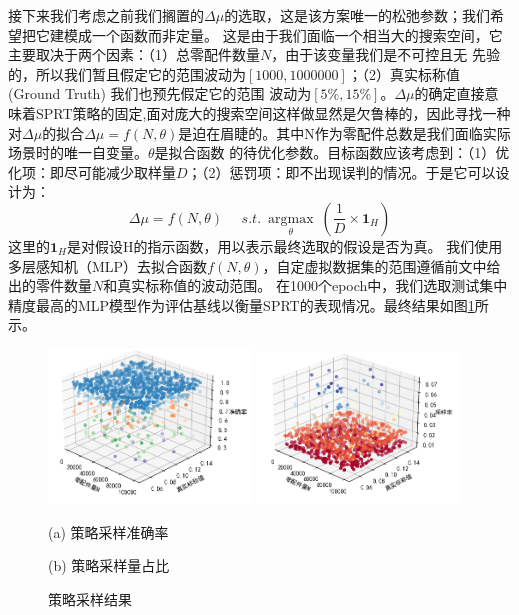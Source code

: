 \documentclass[withoutpreface,bwprint]{cumcmthesis} %
\begin{document}
接下来我们考虑之前我们搁置的$\Delta \mu$的选取，这是该方案唯一的松弛参数；我们希望把它建模成一个函数而非定量。
这是由于我们面临一个相当大的搜索空间，它主要取决于两个因素：（1）总零配件数量$N$，由于该变量我们是不可控且无
先验的，所以我们暂且假定它的范围波动为$[1000,1000000]$；（2）真实标称值(Ground Truth) 我们也预先假定它的范围
波动为$[5\%,15\%]$。$\Delta \mu$的确定直接意味着SPRT策略的固定,面对庞大的搜索空间这样做显然是欠鲁棒的，因此寻找一种
对$\Delta \mu$的拟合$\Delta \mu = f(N,\theta)$是迫在眉睫的。其中N作为零配件总数是我们面临实际场景时的唯一自变量。$\theta$是拟合函数
的待优化参数。目标函数应该考虑到：（1）优化项：即尽可能减少取样量$D$；（2）惩罚项：即不出现误判的情况。于是它可以设计为：
\begin{equation}
	\Delta \mu = f(N,\theta) \ \ \ \ \ \ s.t. \ \underset{\theta}{\operatorname{argmax}} \ (\frac{1}{D} \times \mathbf{1}_H)
\end{equation}
这里的$\mathbf{1}_H$是对假设H的指示函数，用以表示最终选取的假设是否为真。
我们使用多层感知机（MLP）去拟合函数$f(N,\theta)$，自定虚拟数据集的范围遵循前文中给出的零件数量$N$和真实标称值的波动范围。
在1000个epoch中，我们选取测试集中精度最高的MLP模型作为评估基线以衡量SPRT的表现情况。最终结果如图\ref{Pro1_result}所示。
\begin{figure}[htbp]
	\centering
	\includegraphics[width=0.48\textwidth]{Fig/Pro1_Accuracy.png}
	\includegraphics[width=0.48\textwidth]{Fig/Pro1_D.png}

	\begin{minipage}[b]{0.48\textwidth}
		\centering
		(a) 策略采样准确率
	\end{minipage}
	\begin{minipage}[b]{0.48\textwidth}
		\centering
		(b) 策略采样量占比
	\end{minipage}
	\caption{策略采样结果}
	\label{Pro1_result}
\end{figure}
\end{document}
